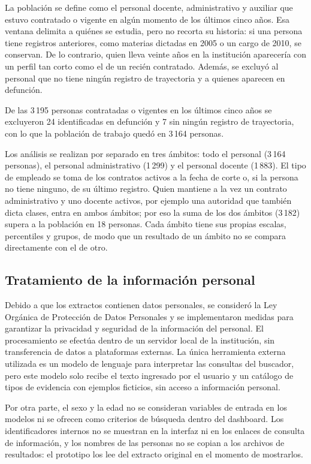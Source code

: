 La población se define como el personal docente, administrativo y auxiliar que estuvo contratado o vigente en algún momento de los últimos cinco años. Esa ventana delimita a quiénes se estudia, pero no recorta su historia: si una persona tiene registros anteriores, como materias dictadas en 2005 o un cargo de 2010, se conservan. De lo contrario, quien lleva veinte años en la institución aparecería con un perfil tan corto como el de un recién contratado. Además, se excluyó al personal que no tiene ningún registro de trayectoria y a quienes aparecen en defunción.

De las 3\,195 personas contratadas o vigentes en los últimos cinco años se excluyeron 24 identificadas en defunción y 7 sin ningún registro de trayectoria, con lo que la población de trabajo quedó en 3\,164 personas.

Los análisis se realizan por separado en tres ámbitos: todo el personal (3\,164 personas), el personal administrativo (1\,299) y el personal docente (1\,883). El tipo de empleado se toma de los contratos activos a la fecha de corte o, si la persona no tiene ninguno, de su último registro. Quien mantiene a la vez un contrato administrativo y uno docente activos, por ejemplo una autoridad que también dicta clases, entra en ambos ámbitos; por eso la suma de los dos ámbitos (3\,182) supera a la población en 18 personas. Cada ámbito tiene sus propias escalas, percentiles y grupos, de modo que un resultado de un ámbito no se compara directamente con el de otro.

\subsection{Tratamiento de la información personal}

Debido a que los extractos contienen datos personales, se consideró la Ley Orgánica de Protección de Datos Personales \parencite{LOPDP2021} y se implementaron medidas para garantizar la privacidad y seguridad de la información del personal. El procesamiento se efectúa dentro de un servidor local de la institución, sin transferencia de datos a plataformas externas. La única herramienta externa utilizada es un modelo de lenguaje para interpretar las consultas del buscador, pero este modelo solo recibe el texto ingresado por el usuario y un catálogo de tipos de evidencia con ejemplos ficticios, sin acceso a información personal.

Por otra parte, el sexo y la edad no se consideran variables de entrada en los modelos ni se ofrecen como criterios de búsqueda dentro del dashboard. Los identificadores internos no se muestran en la interfaz ni en los enlaces de consulta de información, y los nombres de las personas no se copian a los archivos de resultados: el prototipo los lee del extracto original en el momento de mostrarlos.

